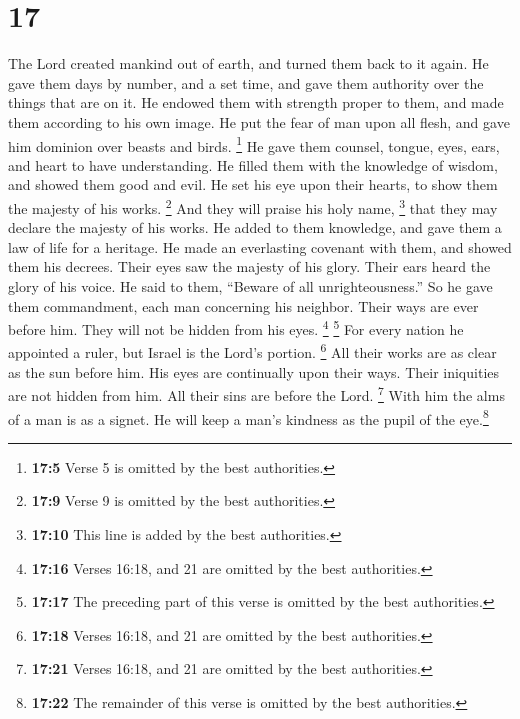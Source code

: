 \hypertarget{section-13}{%
\section{17}\label{section-13}}

 The Lord created mankind out of earth, and turned them
back to it again.  He gave them days by number, and a set
time, and gave them authority over the things that are on it.
 He endowed them with strength proper to them, and made
them according to his own image.  He put the fear of man
upon all flesh, and gave him dominion over beasts and birds.
 \footnote{\textbf{17:5} Verse 5 is omitted by the best
  authorities.}  He gave them counsel, tongue, eyes, ears,
and heart to have understanding.  He filled them with the
knowledge of wisdom, and showed them good and evil.  He
set his eye upon their hearts, to show them the majesty of his works.
 \footnote{\textbf{17:9} Verse 9 is omitted by the best
  authorities.}  And they will praise his holy name,
\footnote{\textbf{17:10} This line is added by the best authorities.}
that they may declare the majesty of his works.  He added
to them knowledge, and gave them a law of life for a heritage.
 He made an everlasting covenant with them, and showed
them his decrees.  Their eyes saw the majesty of his
glory. Their ears heard the glory of his voice.  He said
to them, ``Beware of all unrighteousness.'' So he gave them commandment,
each man concerning his neighbor.  Their ways are ever
before him. They will not be hidden from his eyes. 
\footnote{\textbf{17:16} Verses 16:18, and 21 are omitted by the best
  authorities.}  \footnote{\textbf{17:17} The preceding
  part of this verse is omitted by the best authorities.} For every
nation he appointed a ruler, but Israel is the Lord's portion.
 \footnote{\textbf{17:18} Verses 16:18, and 21 are
  omitted by the best authorities.}  All their works are
as clear as the sun before him. His eyes are continually upon their
ways.  Their iniquities are not hidden from him. All
their sins are before the Lord.  \footnote{\textbf{17:21}
  Verses 16:18, and 21 are omitted by the best authorities.}
 With him the alms of a man is as a signet. He will keep
a man's kindness as the pupil of the eye.\footnote{\textbf{17:22} The
  remainder of this verse is omitted by the best authorities.}
